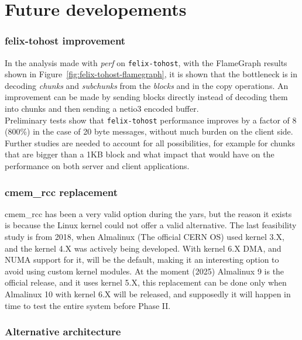\section{Future developements}

\subsubsection{felix-tohost improvement}
\label{subsec:felix-tohost-improvement}

In the analysis made with \emph{perf} on \texttt{felix-tohost}, with the FlameGraph results shown in Figure~\ref{fig:felix-tohost-flamegraph}, it is shown that the bottleneck is in decoding \emph{chunks} and \emph{subchunks} from the \emph{blocks} and in the copy operations. An improvement can be made by sending blocks directly instead of decoding them into chunks and then sending a netio3 encoded buffer.\\
Preliminary tests show that \texttt{felix-tohost} performance improves by a factor of 8 (800\%) in the case of 20 byte messages, without much burden on the client side. Further studies are needed to account for all possibilities, for example for chunks that are bigger than a 1KB block and what impact that would have on the performance on both server and client applications.

\subsubsection{cmem\_rcc replacement}

cmem\_rcc has been a very valid option during the yars, but the reason it exists is because the Linux kernel could not offer a valid alternative. The last feasibility study is from 2018, when Almalinux (The official \acs{CERN} OS) used kernel 3.X, and the kernel 4.X was actively being developed. With kernel 6.X \acs{DMA}, and \acs{NUMA} support for it, will be the default, making it an interesting option to avoid using custom kernel modules. At the moment (2025) Almalinux 9 is the official release, and it uses kernel 5.X, this replacement can be done only when Almalinux 10 with kernel 6.X will be released, and supposedly it will happen in time to test the entire system before Phase II.

\subsubsection{Alternative architecture}

